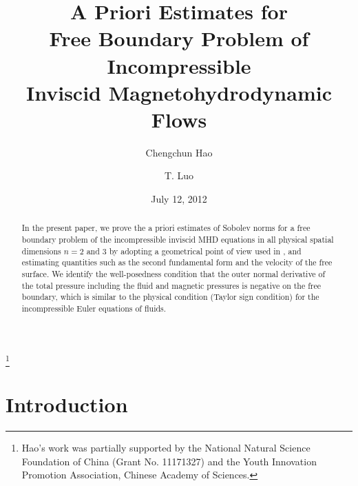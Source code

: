 \documentclass[12pt,reqno]{amsart}
\numberwithin{equation}{section}
\theoremstyle{definition}
\theoremstyle{remark}
\begin{document}
\title[A priori estimates for free boundary incompressible MHD]{A Priori Estimates for\\ Free Boundary Problem of Incompressible\\ Inviscid Magnetohydrodynamic Flows}
\author{Chengchun Hao}\address{Institute of Mathematics,
 Academy of Mathematics \& Systems Science,
 and Hua Loo-Keng Key Laboratory of Mathematics,
  Chinese Academy of Sciences,
   Beijing 100190, China}
\thanks{Hao's work was partially supported by the National Natural Science Foundation of China (Grant No. 11171327) and the Youth Innovation Promotion Association, Chinese Academy of Sciences.}
\author{T. Luo}
\address{
Math. Sci. Center,  Tsinghua University,
  and Morningside Center, CAS,
   Beijing, China}
\date{July 12, 2012}

\begin{abstract}
   In the present paper, we prove the a priori estimates of Sobolev norms for a free boundary problem of the incompressible inviscid MHD equations in all physical spatial dimensions $n=2$ and $3$ by adopting a geometrical point of view used in \cite{CL00}, and estimating quantities such as the second fundamental form and the velocity of the free surface. We identify the well-posedness condition that the outer normal derivative of  the total pressure including the fluid  and magnetic pressures is negative on the free boundary, which is similar to the physical condition (Taylor sign condition) for the incompressible Euler equations of fluids.
\end{abstract}


\maketitle

\tableofcontents
\section{Introduction}
\end{document}
